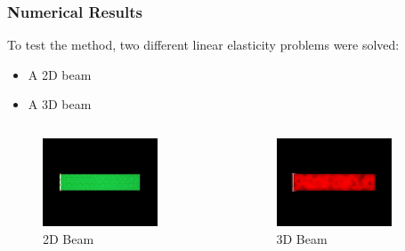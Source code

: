 \documentclass{beamer}
\begin{document}
\begin{frame}
    \frametitle{Numerical Results}
    To test the method, two different linear elasticity problems were solved:
    \begin{itemize}
        \item A 2D beam
        \item A 3D beam
    \end{itemize}
    \begin{columns}
        \begin{figure}
            \centering
            \includegraphics[width=0.8\textwidth]{Images/2D_beam.png}
            \caption{2D Beam}
        \end{figure}
        \begin{figure}
            \centering
            \includegraphics[width=0.8\textwidth]{Images/3D_beam.png}
            \caption{3D Beam}
        \end{figure}
    \end{columns}
\end{frame}
\end{document}
